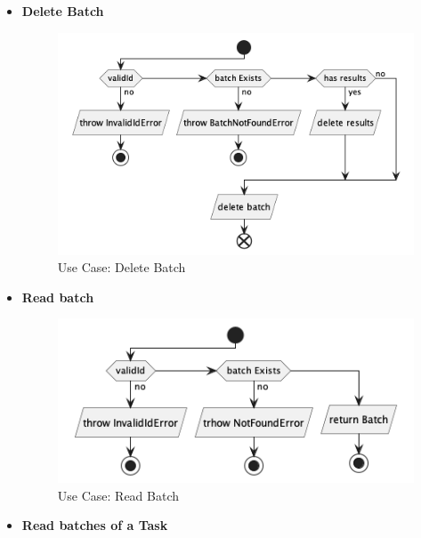 \begin{itemize}
    \item \textbf{Delete Batch}

    \begin{figure}[H]
        \centering
        \includegraphics[height=0.2\textheight]{./part/Proyecto_ejecutivo/memoria_descriptiva/descripcionDelProyecto/manager/uml/deleteBatchUseCase}
        \caption{Use Case: Delete Batch}\label{fig:Use Case: Delete Batch}
    \end{figure}

    \item \textbf{Read batch}

    \begin{figure}[H]
        \centering
        \includegraphics[height=0.2\textheight]{./part/Proyecto_ejecutivo/memoria_descriptiva/descripcionDelProyecto/manager/uml/getBatchUseCase}
        \caption{Use Case: Read Batch}\label{fig:Use Case: Read Batch}
    \end{figure}

    \item \textbf{Read batches of a Task}


\end{itemize}
